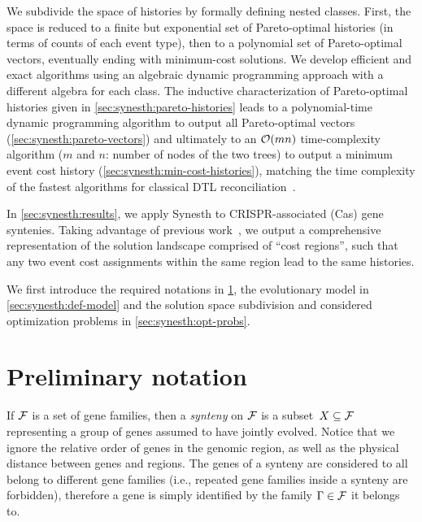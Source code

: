 We subdivide the space of histories by formally defining nested classes.
First, the space is reduced to a finite but exponential set of Pareto-optimal histories (in terms of counts of each event type), then to a polynomial set of Pareto-optimal vectors, eventually ending with minimum-cost solutions.
We develop efficient and exact algorithms using an algebraic dynamic programming approach with a different algebra for each class.
The inductive characterization of Pareto-optimal histories given in \cref{sec:synesth:pareto-histories} leads to a polynomial-time dynamic programming algorithm to output all Pareto-optimal vectors (\cref{sec:synesth:pareto-vectors}) and ultimately to an \(\operatorname{\mathcal{O}}(mn)\) time-complexity algorithm (\(m\) and \(n\): number of nodes of the two trees) to output a minimum event cost history (\cref{sec:synesth:min-cost-histories}), matching the time complexity of the fastest algorithms for classical DTL reconciliation~\parencite{Weiner2021ImprovedDuplicationTransfer}.

In \cref{sec:synesth:results}, we apply Synesth to CRISPR-associated (Cas) gene syntenies.
Taking advantage of previous work~\parencite{LibeskindHadas2022TreeReconciliationMethods,LibeskindHadas2014ParetoOptimalPhylogenetic}, we output a comprehensive representation of the solution landscape comprised of \enquote{cost regions}, such that any two event cost assignments within the same region lead to the same histories.

We first introduce the required notations in \cref{sec:synesth:defs}, the evolutionary model in \cref{sec:synesth:def-model} and the solution space subdivision and considered optimization problems in \cref{sec:synesth:opt-probs}.

\section{Preliminary notation}\label{sec:synesth:defs}

If \(\mathcal{F}\) is a set of gene families, then a \emph{synteny} on \(\mathcal{F}\) is a subset~\(X \subseteq \mathcal{F}\) representing a group of genes assumed to have jointly evolved.
Notice that we ignore the relative order of genes in the genomic region, as well as the physical distance between genes and regions.
The genes of a synteny are considered to all belong to different gene families (i.e., repeated gene families inside a synteny are forbidden),
therefore a gene is simply identified by the family \(\Gamma \in \mathcal{F}\) it belongs to.

